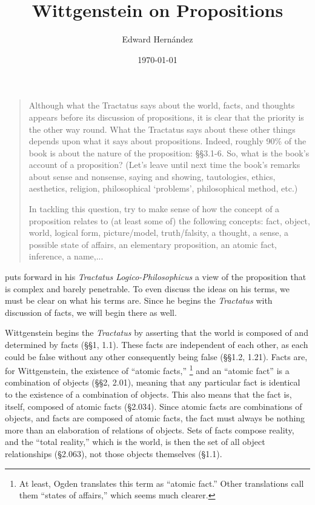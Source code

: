 \documentclass[man,12pt,natbib]{apa6}
\begin{document}
\title{Wittgenstein on Propositions}
\author{Edward Hern\'{a}ndez}
\date{\today}

\maketitle

\begin{quote}
	Although what the Tractatus says about the world, facts, and thoughts
	appears before its discussion of propositions, it is clear that the
	priority is the other way round.  What the Tractatus says about these other
	things depends upon what it says about propositions.  Indeed, roughly 90\%
	of the book is about the nature of the proposition: \S\S 3.1-6.  So, what
	is the book's account of a proposition?  (Let's leave until next time the
	book's remarks about sense and nonsense, saying and showing, tautologies,
	ethics, aesthetics, religion, philosophical `problems', philosophical
	method, etc.) 

	In tackling this question, try to make sense of how the concept of a
	proposition relates to (at least some of) the following concepts: fact,
	object, world, logical form, picture/model, truth/falsity, a thought, a
	sense, a possible state of affairs, an elementary proposition, an atomic
	fact, inference, a name,... 
\end{quote}
\clearpage

 \citet{Wittgenstein22} puts forward in his \emph{Tractatus
 Logico-Philosophicus} a view of the proposition that is complex and barely
 penetrable. To even discuss the ideas on his terms, we must be clear on what
 his terms are. Since he begins the \emph{Tractatus} with discussion of facts,
 we will begin there as well.

 Wittgenstein begins the \emph{Tractatus} by asserting that the world is
 composed of and determined by facts (\S\S 1, 1.1). These facts are independent
 of each other, as each could be false without any other consequently being
 false (\S\S 1.2, 1.21). Facts are, for Wittgenstein, the existence of “atomic
 facts,” \footnote{At least, Ogden translates this term as ``atomic fact.''
 Other translations call them ``states of affairs,'' which seems much clearer.}
 and an ``atomic fact''  is a combination of objects (\S\S 2, 2.01), meaning
 that any particular fact is identical to the existence of a combination of
 objects.  This also means that the fact is, itself, composed of atomic facts
 (\S 2.034).  Since atomic facts are combinations of objects, and facts are
 composed of atomic facts, the fact must always be nothing more than an
 elaboration of relations of objects. Sets of facts compose reality, and the
 ``total reality,'' which is the world, is then the set of all object
 relationships (\S 2.063), not those objects themselves (\S 1.1).
\end{document}
